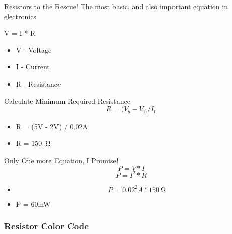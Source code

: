\documentclass[serif,mathserif, 12pt]{beamer}
\begin{document}
\begin {frame}{Resistors to the Rescue!}
    The most basic, and also important equation in electronics
    
    V = I * R \pause
    
    \begin{itemize}
        \item V - Voltage \pause
        \item I - Current \pause
        \item R - Resistance
    \end{itemize}
\end{frame}

\begin{frame}{Calculate Minimum Required Resistance}
    \[R = (V_{\textbf{s}} - V_{\textbf{f})} / I_{\textbf{f}} \] \pause
    \begin{itemize}
        \item R = (5V - 2V) / 0.02A \pause
        \item R = \SI{150}{\ohm}
    \end{itemize}
\end{frame}

\begin{frame}{Only One more Equation, I Promise!}
    \[P = V * I \]
    \[P = I^2 * R\]
    \begin{itemize}
        \item \[P = 0.02^2 A * \SI{150}{\ohm}\] \pause
        \item P = 60mW
    \end{itemize}
\end{frame}

\begin{frame}
  \frametitle{Resistor Color Code}
  \begin{figure}
    \centering
  \end{figure}
\end{frame}
\end{document}
